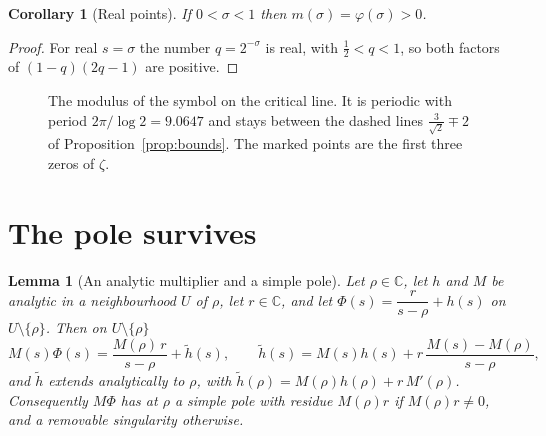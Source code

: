 \documentclass[11pt]{amsart}
\newtheorem{lemma}[theorem]{Lemma}
\newtheorem{corollary}[theorem]{Corollary}
\theoremstyle{definition}
\theoremstyle{remark}
\newcommand{\C}{\mathbb{C}}
\begin{document}
\begin{corollary}[Real points]\label{cor:real}
If $0<\sigma<1$ then $m(\sigma)=\varphi(\sigma)>0$.
\end{corollary}

\begin{proof}
For real $s=\sigma$ the number $q=2^{-\sigma}$ is real, with $\tfrac12<q<1$, so both factors of
$(1-q)(2q-1)$ are positive.
\end{proof}

\begin{figure}[t]
\centering
{}
\caption{The modulus of the symbol on the critical line. It is periodic with period
$2\pi/\log 2=9.0647$ and stays between the dashed lines $\tfrac{3}{\sqrt2}\mp2$ of
Proposition~\ref{prop:bounds}. The marked points are the first three zeros of $\zeta$.}
\label{fig:critical}
\end{figure}

\section{The pole survives}\label{sec:pole}

\begin{lemma}[An analytic multiplier and a simple pole]\label{lem:multiplier}
Let $\rho\in\C$, let $h$ and $M$ be analytic in a neighbourhood $U$ of $\rho$, let $r\in\C$, and let
$\Phi(s)=\dfrac{r}{s-\rho}+h(s)$ on $U\setminus\{\rho\}$. Then on $U\setminus\{\rho\}$
\[
M(s)\Phi(s)=\frac{M(\rho)\,r}{s-\rho}+\tilde h(s),\qquad
\tilde h(s)=M(s)h(s)+r\,\frac{M(s)-M(\rho)}{s-\rho},
\]
and $\tilde h$ extends analytically to $\rho$, with $\tilde h(\rho)=M(\rho)h(\rho)+r\,M'(\rho)$.
Consequently $M\Phi$ has at $\rho$ a simple pole with residue $M(\rho)r$ if $M(\rho)r\ne0$, and a
removable singularity otherwise.
\end{lemma}
\end{document}
